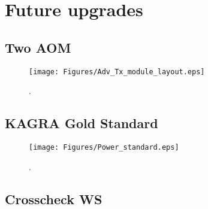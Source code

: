 
\chapter{Future upgrades} %

\label{Chapter7} %
\section{Two AOM}
\begin{figure}
\begin{center}
\texttt{[image: Figures/Adv\_Tx\_module\_layout.eps]}
\caption{.} 
\label{fig:Adv_Tx_module_layout} 
\end{center}
\end{figure}

\section{KAGRA Gold Standard}

\begin{figure}
\begin{center}
\texttt{[image: Figures/Power\_standard.eps]}
\caption{.} 
\label{fig:Power_standard} 
\end{center}
\end{figure}

\section{Crosscheck WS}
